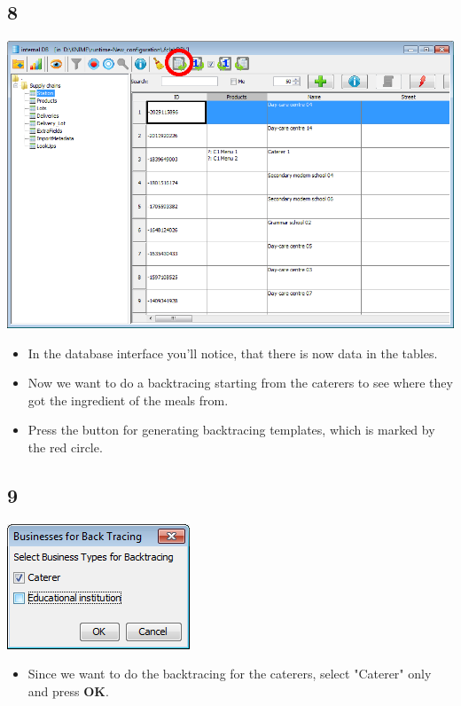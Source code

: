 \documentclass{beamer}
\begin{document}
\subsection{8}
\begin{frame}
	\begin{center}
  		\includegraphics[height=0.5\textheight]{8.png}
	\end{center}
	\begin{itemize}
		\item In the database interface you'll notice, that there is now data in the tables.
		\item Now we want to do a backtracing starting from the caterers to see where they got the ingredient of the meals from.
		\item Press the button for generating backtracing templates, which is marked by the red circle.
	\end{itemize}
\end{frame}

\subsection{9}
\begin{frame}
	\begin{center}
  		\includegraphics[height=0.3\textheight]{9.png}
	\end{center}
	\begin{itemize}
		\item Since we want to do the backtracing for the caterers, select "Caterer" only and press \textbf{OK}.
	\end{itemize}
\end{frame}
\end{document}
